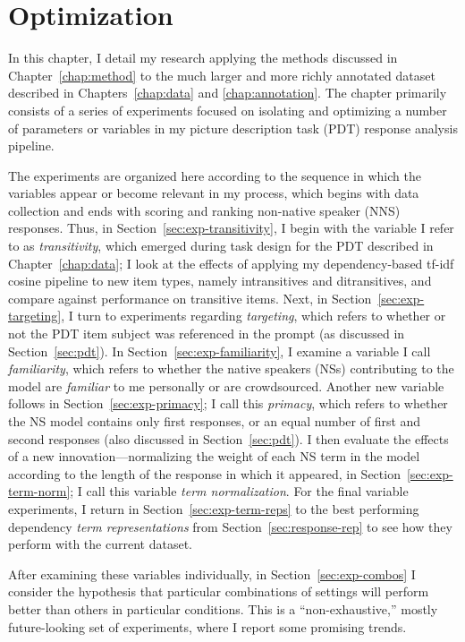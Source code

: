 \chapter{Optimization}
\label{chap:optimization}
In this chapter, I detail my research applying the methods discussed in Chapter~\ref{chap:method} to the much larger and more richly annotated dataset described in Chapters~\ref{chap:data} and \ref{chap:annotation}. The chapter primarily consists of a series of experiments focused on isolating and optimizing a number of parameters or variables in my picture description task (PDT) response analysis pipeline. 

The experiments are organized here according to the sequence in which the variables appear or become relevant in my process, which begins with data collection and ends with scoring and ranking non-native speaker (NNS) responses. Thus, in Section~\ref{sec:exp-transitivity}, I begin with the variable I refer to as \textit{transitivity}, which emerged during task design for the PDT described in Chapter~\ref{chap:data}; I look at the effects of applying my dependency-based tf-idf cosine pipeline to new item types, namely intransitives and ditransitives, and compare against performance on transitive items. Next, in Section~\ref{sec:exp-targeting}, I turn to experiments regarding \textit{targeting}, which refers to whether or not the PDT item subject was referenced in the prompt (as discussed in Section~\ref{sec:pdt}). In Section~\ref{sec:exp-familiarity}, I examine a variable I call \textit{familiarity}, which refers to whether the native speakers (NSs) contributing to the model are \textit{familiar} to me personally or are crowdsourced. Another new variable follows in Section~\ref{sec:exp-primacy}; I call this \textit{primacy}, which refers to whether the NS model contains only first responses, or an equal number of first and second responses (also discussed in Section~\ref{sec:pdt}). I then evaluate the effects of a new innovation---normalizing the weight of each NS term in the model according to the length of the response in which it appeared, in Section~\ref{sec:exp-term-norm}; I call this variable \textit{term normalization}. For the final variable experiments, I return in Section~\ref{sec:exp-term-reps} to the best performing dependency \textit{term representations} from Section~\ref{sec:response-rep} to see how they perform with the current dataset.

After examining these variables individually, in Section~\ref{sec:exp-combos} I consider the hypothesis that particular combinations of settings will perform better than others in particular conditions. This is a ``non-exhaustive,'' mostly future-looking set of experiments, where I report some promising trends.

